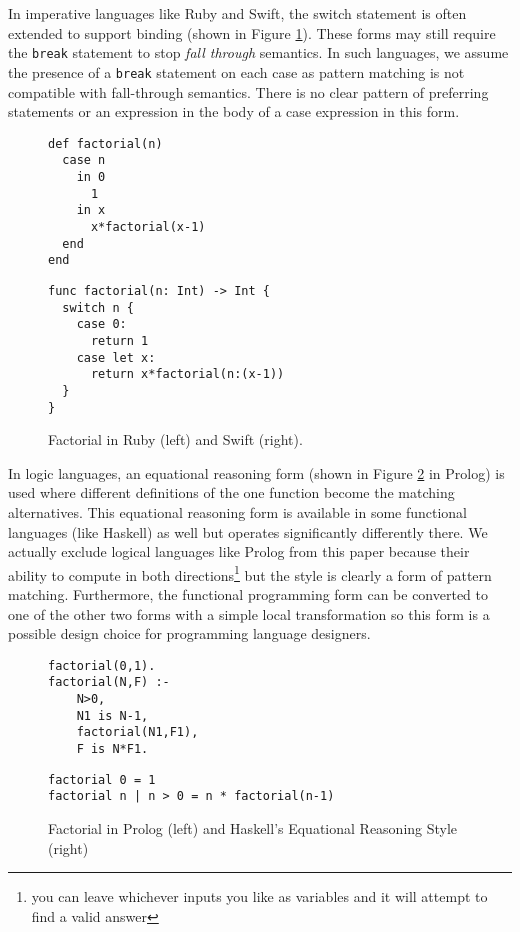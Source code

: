 \documentclass[acmsmall]{acmart}
\begin{document}
In imperative languages like Ruby and Swift, the switch statement is often extended to support binding (shown in Figure \ref{lst:ruby_swift}).  These forms may still require the \lstinline{break} statement to stop \emph{fall through} semantics.  In such languages, we assume the presence of a \lstinline{break} statement on each case as pattern matching is not compatible with fall-through semantics.  There is no clear pattern of preferring statements or an expression in the body of a case expression in this form.

\begin{figure}
\hspace{-2em}
\begin{minipage}[t]{0.35\linewidth}
\begin{lstlisting}
def factorial(n)
  case n
    in 0
      1
    in x
      x*factorial(x-1)
  end
end   
\end{lstlisting}
\end{minipage}\hspace{2em}
\begin{minipage}[t]{0.55\linewidth}
\begin{lstlisting}
func factorial(n: Int) -> Int {
  switch n {
    case 0:
      return 1
    case let x:
      return x*factorial(n:(x-1))
  }
}
\end{lstlisting}
\end{minipage}
\caption{Factorial in Ruby (left) and Swift (right).}
\label{lst:ruby_swift}
\end{figure}


In logic languages, an equational reasoning form (shown in Figure \ref{lst:prolog} in Prolog) is used where different definitions of the one function become the matching alternatives.  This equational reasoning form is available in some functional languages (like Haskell) as well but operates significantly differently there.  We actually exclude logical languages like Prolog from this paper because their ability to compute in both directions\footnote{you can leave whichever inputs you like as variables and it will attempt to find a valid answer} but the style is clearly a form of pattern matching.  Furthermore, the functional programming form can be converted to one of the other two forms with a simple local transformation so this form is a possible design choice for programming language designers.
\begin{figure}
\begin{minipage}[t]{0.35\linewidth}
\begin{lstlisting}
factorial(0,1).
factorial(N,F) :-
    N>0,
    N1 is N-1,
    factorial(N1,F1),
    F is N*F1.
\end{lstlisting}
\end{minipage}
\begin{minipage}[t]{0.55\linewidth}
\begin{lstlisting}
factorial 0 = 1
factorial n | n > 0 = n * factorial(n-1)
\end{lstlisting}
\end{minipage}
\caption{Factorial in Prolog (left) and Haskell's Equational Reasoning Style (right) }
\label{lst:prolog}
\end{figure}
\end{document}
